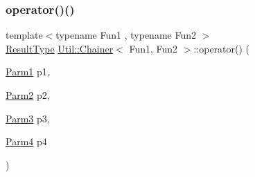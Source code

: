 \mbox{\label{classUtil_1_1Chainer_aebe5bd1cb7c2523124ccdf2b406ff7d1}} 
\subsubsection{\texorpdfstring{operator()()}{operator()()}\hspace{0.1cm}{\footnotesize\ttfamily [9/12]}}
{\footnotesize\ttfamily template$<$typename Fun1 , typename Fun2 $>$ \\
\mbox{\hyperlink{classUtil_1_1Chainer_a2c8d88a77b8ba93eb915dc799ddafbb9}{Result\+Type}} \mbox{\hyperlink{classUtil_1_1Chainer}{Util\+::\+Chainer}}$<$ Fun1, Fun2 $>$\+::operator() (\begin{DoxyParamCaption}\item[{\mbox{\hyperlink{classUtil_1_1Chainer_a3e09b2267dabdd8d12070b09c47749c6}{Parm1}}}]{p1,  }\item[{\mbox{\hyperlink{classUtil_1_1Chainer_a1bfb0e8f35679278c85d232a74a107ff}{Parm2}}}]{p2,  }\item[{\mbox{\hyperlink{classUtil_1_1Chainer_ac28811d7153f7b7cf837f7b8626436c8}{Parm3}}}]{p3,  }\item[{\mbox{\hyperlink{classUtil_1_1Chainer_a82e756f3083e3883a05644425474f789}{Parm4}}}]{p4 }\end{DoxyParamCaption})\hspace{0.3cm}{\ttfamily [inline]}}

\mbox{\label{classUtil_1_1Chainer_aebe5bd1cb7c2523124ccdf2b406ff7d1}} 
